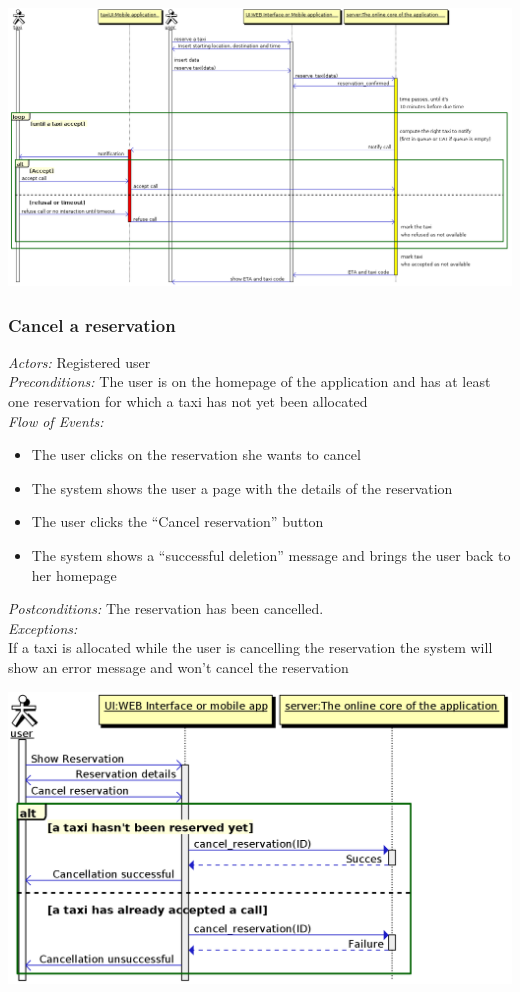 \documentclass{article}
\begin{document}
\begin{center}	
	\includegraphics[width=\textwidth,keepaspectratio]{Sequence-Diagrams/reserve-a-taxi}
\end{center}
\subsubsection{Cancel a reservation}
\textit{Actors:} Registered user
\\\textit{Preconditions:} The user is on the homepage of the application and has at least one reservation for which a taxi has not yet been allocated
\\\textit{Flow of Events:}
\begin{itemize}
	\item  The user clicks on the reservation she wants to cancel
	\item  The system shows the user a page with the details of the reservation
	\item  The user clicks the ``Cancel reservation'' button
	\item  The system shows a ``successful deletion'' message and brings the user back to her homepage
\end{itemize}
\textit{Postconditions:} The reservation has been cancelled.
\\\textit{Exceptions:}
\\If a taxi is allocated while the user is cancelling the reservation the system will show an error message and won't cancel the reservation
\begin{center}	
	\includegraphics[width=\textwidth,keepaspectratio]{Sequence-Diagrams/cancel-reservation}
\end{center}
\end{document}

